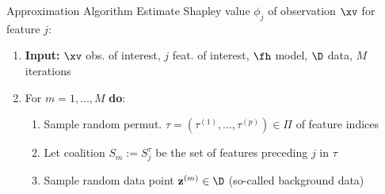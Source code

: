 \documentclass[10pt,compress,t,notes=noshow, xcolor=table]{beamer}
\newcommand{\Sm}{S_m}%
\newcommand{\Smj}{\Sm \cup \{j\}}
\newcommand{\minusSmj}{- \{\Sm \cup \{j\} \} }
\newcommand{\Stau}{S_{j}^\tau}%
\newcommand{\xjp}{\xv_{+j}^{(m)}}
\newcommand{\xjm}{\xv_{-j}^{(m)}}
\begin{document}
\begin{framev}[align=top]{Approximation Algorithm }
Estimate Shapley value $\phi_j$ of observation $\xv$ for feature $j$:
\begin{enumerate}[<+->]
\item[$\bullet$] \textbf{Input:} $\xv$ obs. of interest, $j$ feat. of interest, $\fh$ model, $\D$ data, $M$ iterations
\item For $m = 1, \ldots, M$ \textbf{do}:
\begin{enumerate}
\item Sample random permut. $\tau = (\tau^{(1)}, \ldots, \tau^{(p)}) \in \Pi$ of feature indices%
\item Let coalition $\Sm := \Stau$ be the set of features preceding $j$ in $\tau$
\item Sample random data point {\color{blue} $\mathbf{z}^{(m)} \in \D$} (so-called background data)%

\end{enumerate}
\end{enumerate}
\end{framev}
\end{document}
